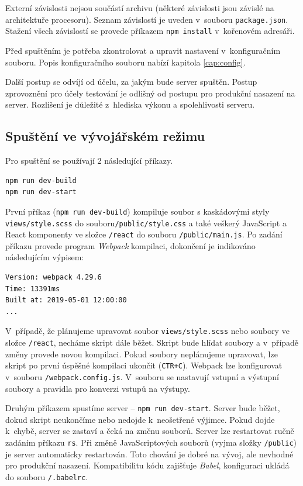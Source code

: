 Externí závislosti nejsou součástí archivu (některé závislosti jsou závislé na architektuře procesoru). Seznam závislostí je uveden v~souboru \texttt{package.json}. Stažení všech závislostí se provede příkazem \texttt{npm install} v~kořenovém adresáři.

Před spuštěním je potřeba zkontrolovat a upravit nastavení v~konfiguračním souboru. Popis konfiguračního souboru nabízí kapitola \ref{cap:config}.

Další postup se odvíjí od účelu, za jakým bude server spuštěn. Postup zprovoznění pro účely testování je odlišný od postupu pro produkční nasazení na server. Rozlišení je důležité z~hlediska výkonu a spolehlivosti serveru.

\subsection{Spuštění ve vývojářském režimu}
Pro spuštění se používají 2 následující příkazy.
\begin{lstlisting}[style=bash]
npm run dev-build
npm run dev-start
\end{lstlisting}
První příkaz (\texttt{npm run dev-build}) kompiluje soubor s kaskádovými styly \texttt{views/style.scss} do souboru\texttt{/public/style.css} a také veškerý JavaScript a React komponenty ve složce \texttt{/react} do souboru \texttt{/public/main.js}. Po zadání příkazu provede program \textit{Webpack} kompilaci, dokončení je indikováno následujícím výpisem:
\begin{lstlisting}
Version: webpack 4.29.6
Time: 13391ms
Built at: 2019-05-01 12:00:00
...
\end{lstlisting}

V~případě, že plánujeme upravovat soubor \texttt{views/style.scss} nebo soubory ve složce \texttt{/react}, necháme skript dále běžet. Skript bude hlídat soubory a v~případě změny provede novou kompilaci. Pokud soubory neplánujeme upravovat, lze skript po první úspěšné kompilaci ukončit (\texttt{CTR+C}). Webpack lze konfigurovat v~souboru \texttt{/webpack.config.js}. V~souboru se nastavují vstupní a výstupní soubory a pravidla pro konverzi vstupů na výstupy.

Druhým příkazem spustíme server -- \texttt{npm run dev-start}. Server bude běžet, dokud skript neukončíme nebo nedojde k~neošetřené výjimce. Pokud dojde k~chybě, server se zastaví a čeká na změnu souborů. Server lze restartovat ručně zadáním příkazu \texttt{rs}. Při změně JavaScriptových souborů (vyjma složky \texttt{/public}) je server automaticky restartován. Toto chování je dobré na vývoj, ale nevhodné pro produkční nasazení. Kompatibilitu kódu zajišťuje \textit{Babel}, konfiguraci ukládá do souboru \texttt{/.babelrc}.

